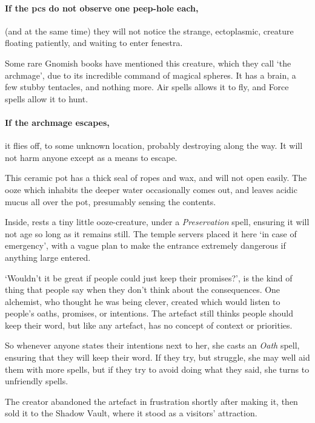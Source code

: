 \paragraph{If the \glspl{pc} do not observe one peep-hole each,}
(and at the same time)
they will not notice the strange, ectoplasmic, creature floating patiently, and waiting to enter \gls{fenestra}.

Some rare Gnomish books have mentioned this creature, which they call `the archmage', due to its incredible command of magical spheres.
It has a brain, a few stubby tentacles, and nothing more.
Air spells allows it to fly, and Force spells allow it to hunt.

\paragraph{If the archmage escapes,}
it flies off, to some unknown location, probably destroying  along the way.
It will not harm anyone except as a means to escape.

\archmage

\showStdSpells


This ceramic pot has a thick seal of ropes and wax, and will not open easily.
The ooze which inhabits the deeper water  occasionally comes out, and leaves acidic mucus all over the pot, presumably sensing the contents.

Inside, rests a tiny little ooze-creature, under a \textit{Preservation} spell, ensuring it will not age so long as it remains still.
The temple \glspl{server} placed it here `in case of emergency', with a vague plan to make the entrance extremely dangerous if anything large entered.



\begin{exampletext}
  `Wouldn't it be great if people could just keep their promises?', is the kind of thing that people say when they don't think about the consequences.
  One alchemist, who thought he was being clever, created  which would listen to people's oaths, promises, or intentions.
  The \gls{artefact} still thinks people should keep their word, but like any \gls{artefact}, has no concept of context or priorities.

  So whenever anyone states their intentions next to her, she casts an \textit{Oath} spell, ensuring that they will keep their word.
  If they try, but struggle, she may well aid them with more spells, but if they try to avoid doing what they said, she turns to unfriendly spells.

  The creator abandoned the \gls{artefact} in frustration shortly after making it, then sold it to the Shadow Vault, where it stood as a visitors' attraction.
\end{exampletext}

